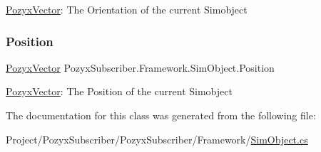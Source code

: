 \hyperlink{struct_pozyx_subscriber_1_1_framework_1_1_pozyx_vector}{Pozyx\+Vector}\+: The Orientation of the current Simobject 

\mbox{\label{class_pozyx_subscriber_1_1_framework_1_1_sim_object_a154ba70dc97ab79384ebecae98d69e18}} 
\subsubsection{\texorpdfstring{Position}{Position}}
{\footnotesize\ttfamily \hyperlink{struct_pozyx_subscriber_1_1_framework_1_1_pozyx_vector}{Pozyx\+Vector} Pozyx\+Subscriber.\+Framework.\+Sim\+Object.\+Position\hspace{0.3cm}{\ttfamily [get]}}



\hyperlink{struct_pozyx_subscriber_1_1_framework_1_1_pozyx_vector}{Pozyx\+Vector}\+: The Position of the current Simobject 



The documentation for this class was generated from the following file\+:\begin{DoxyCompactItemize}
\item 
Project/\+Pozyx\+Subscriber/\+Pozyx\+Subscriber/\+Framework/\hyperlink{_sim_object_8cs}{Sim\+Object.\+cs}\end{DoxyCompactItemize}
